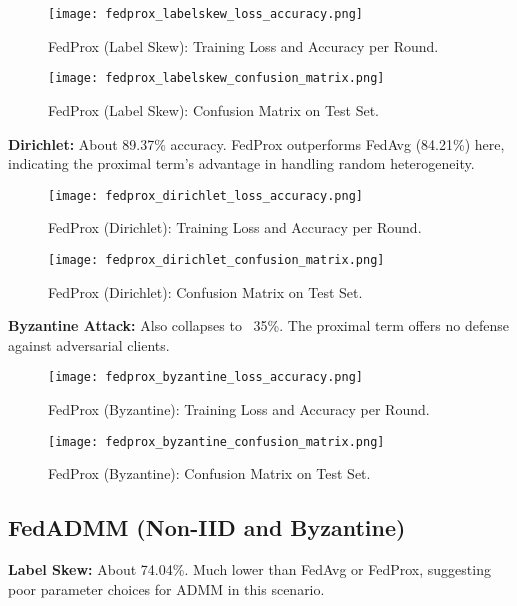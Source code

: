 \documentclass[12pt,a4paper]{report}
\begin{document}
\begin{figure}[H]
	\centering
	\texttt{[image: fedprox\_labelskew\_loss\_accuracy.png]}
	\caption{FedProx (Label Skew): Training Loss and Accuracy per Round.}
\end{figure}

\begin{figure}[H]
	\centering
	\texttt{[image: fedprox\_labelskew\_confusion\_matrix.png]}
	\caption{FedProx (Label Skew): Confusion Matrix on Test Set.}
\end{figure}

\textbf{Dirichlet:} About 89.37\% accuracy. FedProx outperforms FedAvg (84.21\%) here, indicating the proximal term’s advantage in handling random heterogeneity.

\begin{figure}[H]
	\centering
	\texttt{[image: fedprox\_dirichlet\_loss\_accuracy.png]}
	\caption{FedProx (Dirichlet): Training Loss and Accuracy per Round.}
\end{figure}

\begin{figure}[H]
	\centering
	\texttt{[image: fedprox\_dirichlet\_confusion\_matrix.png]}
	\caption{FedProx (Dirichlet): Confusion Matrix on Test Set.}
\end{figure}

\textbf{Byzantine Attack:} Also collapses to ~35\%. The proximal term offers no defense against adversarial clients.

\begin{figure}[H]
	\centering
	\texttt{[image: fedprox\_byzantine\_loss\_accuracy.png]}
	\caption{FedProx (Byzantine): Training Loss and Accuracy per Round.}
\end{figure}

\begin{figure}[H]
	\centering
	\texttt{[image: fedprox\_byzantine\_confusion\_matrix.png]}
	\caption{FedProx (Byzantine): Confusion Matrix on Test Set.}
\end{figure}

\subsection{FedADMM (Non-IID and Byzantine)}

\textbf{Label Skew:} About 74.04\%. Much lower than FedAvg or FedProx, suggesting poor parameter choices for ADMM in this scenario.
\end{document}
